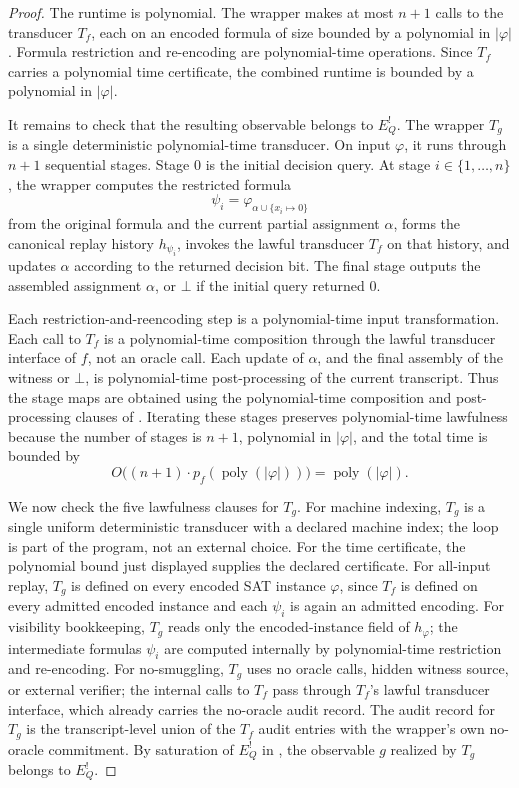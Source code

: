 \documentclass[11pt]{article}
\newcommand{\EQbang}{E^{!}_{Q}}
\theoremstyle{definition}
\begin{document}
\begin{proof}
The runtime is polynomial.  The wrapper makes at most \(n+1\) calls to
the transducer \(T_{f}\), each on an encoded formula of size bounded
by a polynomial in \(|\varphi|\).  Formula restriction and
re-encoding are polynomial-time operations.  Since \(T_{f}\) carries a
polynomial time certificate, the combined runtime is bounded by a
polynomial in \(|\varphi|\).

It remains to check that the resulting observable belongs to
\(\EQbang\).  The wrapper \(T_g\) is a single deterministic
polynomial-time transducer.  On input \(\varphi\), it runs through
\(n+1\) sequential stages.  Stage \(0\) is the initial decision query.
At stage \(i\in\{1,\ldots,n\}\), the wrapper computes the restricted
formula
\[
  \psi_i=\varphi_{\alpha\cup\{x_i\mapsto 0\}}
\]
from the original formula and the current partial assignment
\(\alpha\), forms the canonical replay history \(h_{\psi_i}\), invokes
the lawful transducer \(T_f\) on that history, and updates \(\alpha\)
according to the returned decision bit.  The final stage outputs the
assembled assignment \(\alpha\), or \(\bot\) if the initial query
returned \(0\).

Each restriction-and-reencoding step is a polynomial-time input
transformation.  Each call to \(T_f\) is a polynomial-time composition
through the lawful transducer interface of \(f\), not an oracle call.
Each update of \(\alpha\), and the final assembly of the witness or
\(\bot\), is polynomial-time post-processing of the current transcript.
Thus the stage maps are obtained using the polynomial-time composition
and post-processing clauses of
.  Iterating these stages
preserves polynomial-time lawfulness because the number of stages is
\(n+1\), polynomial in \(|\varphi|\), and the total time is bounded by
\[
  O\bigl((n+1)\cdot p_f(\operatorname{poly}(|\varphi|))\bigr)
  =
  \operatorname{poly}(|\varphi|).
\]

We now check the five lawfulness clauses for \(T_g\).  For machine
indexing, \(T_g\) is a single uniform deterministic transducer with a
declared machine index; the loop is part of the program, not an
external choice.  For the time certificate, the polynomial bound just
displayed supplies the declared certificate.  For all-input replay,
\(T_g\) is defined on every encoded SAT instance \(\varphi\), since
\(T_f\) is defined on every admitted encoded instance and each
\(\psi_i\) is again an admitted encoding.  For visibility bookkeeping,
\(T_g\) reads only the encoded-instance field of \(h_{\varphi}\); the
intermediate formulas \(\psi_i\) are computed internally by
polynomial-time restriction and re-encoding.  For no-smuggling,
\(T_g\) uses no oracle calls, hidden witness source, or external
verifier; the internal calls to \(T_f\) pass through \(T_f\)'s lawful
transducer interface, which already carries the no-oracle audit
record.  The audit record for \(T_g\) is the transcript-level union of
the \(T_f\) audit entries with the wrapper's own no-oracle commitment.
By saturation of \(\EQbang\) in , the
observable \(g\) realized by \(T_g\) belongs to \(\EQbang\).


\end{proof}
\end{document}

